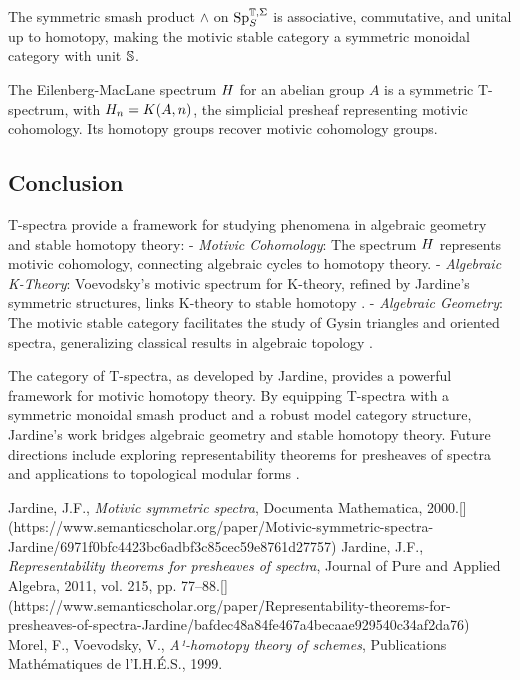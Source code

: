 \documentclass{article}
\begin{document}
\begin{theorem}
The symmetric smash product \( \wedge \) on \( \text{Sp}^{\mathbb{T}, \Sigma}_S \) is associative, commutative, and unital up to homotopy, making the motivic stable category a symmetric monoidal category with unit \( \mathbb{S} \).
\end{theorem}

\begin{example}
The Eilenberg-MacLane spectrum \( H \) for an abelian group \( A \) is a symmetric T-spectrum, with \( H_n = K(A, n) \), the simplicial presheaf representing motivic cohomology. Its homotopy groups recover motivic cohomology groups.
\end{example}

\subsection{Conclusion}

T-spectra provide a framework for studying phenomena in algebraic geometry and stable homotopy theory:
- \emph{Motivic Cohomology}: The spectrum \( H \) represents motivic cohomology, connecting algebraic cycles to homotopy theory.
- \emph{Algebraic K-Theory}: Voevodsky’s motivic spectrum for K-theory, refined by Jardine’s symmetric structures, links K-theory to stable homotopy \cite{Jardine2000MotivicSS}.
- \emph{Algebraic Geometry}: The motivic stable category facilitates the study of Gysin triangles and oriented spectra, generalizing classical results in algebraic topology \cite{Jardine2000MotivicSS}.

The category of T-spectra, as developed by Jardine, provides a powerful framework for motivic homotopy theory. By equipping T-spectra with a symmetric monoidal smash product and a robust model category structure, Jardine’s work bridges algebraic geometry and stable homotopy theory. Future directions include exploring representability theorems for presheaves of spectra and applications to topological modular forms \cite{Jardine2011RepresentabilityTF}.


\begin{thebibliography}{9}
 Jardine, J.F., \emph{Motivic symmetric spectra}, Documenta Mathematica, 2000.[](https://www.semanticscholar.org/paper/Motivic-symmetric-spectra-Jardine/6971f0bfc4423bc6adbf3c85cec59e8761d27757)
 Jardine, J.F., \emph{Representability theorems for presheaves of spectra}, Journal of Pure and Applied Algebra, 2011, vol. 215, pp. 77--88.[](https://www.semanticscholar.org/paper/Representability-theorems-for-presheaves-of-spectra-Jardine/bafdec48a84fe467a4becaae929540c34af2da76)
 Morel, F., Voevodsky, V., \emph{A¹-homotopy theory of schemes}, Publications Mathématiques de l’I.H.É.S., 1999.
\end{thebibliography}
\end{document}
